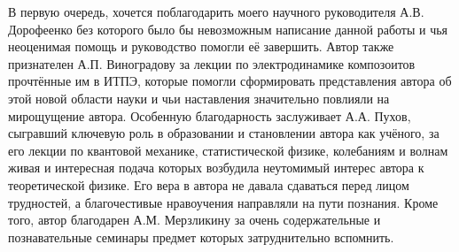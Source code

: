 В первую очередь, хочется поблагодарить моего научного руководителя А.В. Дорофеенко без которого было бы невозможным написание данной работы и чья неоценимая помощь и руководство помогли её завершить. Автор также признателен А.П. Виноградову за лекции по электродинамике композоитов прочтённые им в ИТПЭ, которые помогли сформировать представления автора об этой новой области науки и чьи наставления значительно повлияли на мирощущение автора. Особенную благодарность заслуживает А.А. Пухов, сыгравший ключевую роль в образовании и становлении автора как учёного, за его лекции по квантовой механике, статистической физике, колебаниям и волнам живая и интересная подача которых возбудила неутомимый интерес автора к теоретической физике. Его вера в автора не давала сдаваться перед лицом трудностей, а благочестивые нравоучения направляли на пути познания. Кроме того, автор благодарен А.М. Мерзликину
за очень содержательные и познавательные семинары предмет которых затруднительно вспомнить. 


\pagebreak[4]